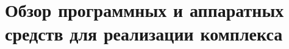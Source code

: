 \section[Обзор программно-аппаратных средств для ...]{Обзор программных и аппаратных средств для реализации комплекса}



